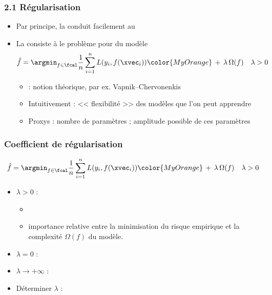 \begin{frame}
  \frametitle{2.1 Régularisation}
  \begin{itemize}
  \item Par principe, la  conduit facilement au 
  \pause
  \item La  consiste à  le problème pour
     du modèle
    \[ \hat{f} = \argmin_{f \in \fcal} \frac1n \sum_{i=1}^n L(y_i, f(\xvec_i))
      {\color{MyOrange} \, + \, \lambda \, \Omega(f) } \hspace{1em} \lambda > 0
    \]
    \begin{itemize}
    \item {} : notion théorique, par ex. Vapnik--Chervonenkis
    \item Intuitivement : << flexibilité >> des modèles que l'on peut apprendre
    \item Proxys : nombre de paramètres ; amplitude possible de ces paramètres
    \end{itemize}
  \end{itemize}
\end{frame}

\begin{frame}
  \frametitle{Coefficient de régularisation}
    \[ \hat{f} = \argmin_{f \in \fcal} \frac1n \sum_{i=1}^n L(y_i, f(\xvec_i))
      {\color{MyOrange} \, + \, \lambda \, \Omega(f) } \hspace{1em} \lambda > 0
    \]
    \begin{itemize}
    \item {} $\lambda > 0$ :
      \begin{itemize}
      \item {} 
      \item importance relative entre la minimisation du risque empirique et la complexité $\Omega(f)$ du modèle.
  \end{itemize}
    \end{itemize}

    \begin{itemize}
    \item $\lambda = 0$ :
    \item $\lambda \to +\infty$ :
    \item Déterminer $\lambda$ :
    \end{itemize}
  \end{frame}

